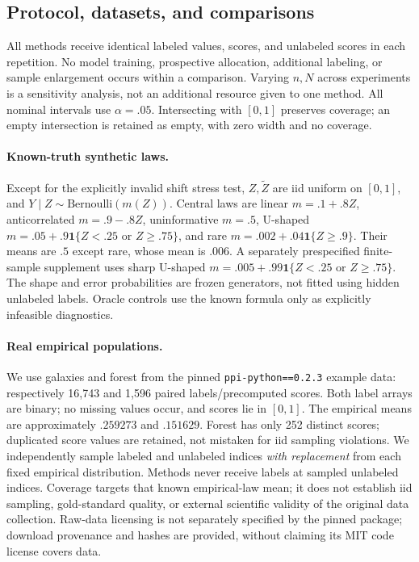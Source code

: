 \documentclass{article}
\newcommand{\ind}{\mathbf{1}}
\begin{document}
\subsection{Protocol, datasets, and comparisons}
All methods receive identical labeled values, scores, and unlabeled scores in each repetition. No model training, prospective allocation, additional labeling, or sample enlargement occurs within a comparison. Varying $n,N$ across experiments is a sensitivity analysis, not an additional resource given to one method. All nominal intervals use $\alpha=.05$. Intersecting with $[0,1]$ preserves coverage; an empty intersection is retained as empty, with zero width and no coverage.

\paragraph{Known-truth synthetic laws.}
Except for the explicitly invalid shift stress test, $Z,\widetilde Z$ are iid uniform on $[0,1]$, and $Y\mid Z\sim\mathrm{Bernoulli}(m(Z))$. Central laws are linear $m=.1+.8Z$, anticorrelated $m=.9-.8Z$, uninformative $m=.5$, U-shaped $m=.05+.9\ind\{Z<.25\text{ or }Z\ge.75\}$, and rare $m=.002+.04\ind\{Z\ge.9\}$. Their means are $.5$ except rare, whose mean is $.006$. A separately prespecified finite-sample supplement uses sharp U-shaped $m=.005+.99\ind\{Z<.25\text{ or }Z\ge.75\}$. The shape and error probabilities are frozen generators, not fitted using hidden unlabeled labels. Oracle controls use the known formula only as explicitly infeasible diagnostics.

\paragraph{Real empirical populations.}
We use galaxies and forest from the pinned \texttt{ppi-python==0.2.3} example data: respectively 16,743 and 1,596 paired labels/precomputed scores. Both label arrays are binary; no missing values occur, and scores lie in $[0,1]$. The empirical means are approximately $.259273$ and $.151629$. Forest has only 252 distinct scores; duplicated score values are retained, not mistaken for iid sampling violations. We independently sample labeled and unlabeled indices \emph{with replacement} from each fixed empirical distribution. Methods never receive labels at sampled unlabeled indices. Coverage targets that known empirical-law mean; it does not establish iid sampling, gold-standard quality, or external scientific validity of the original data collection. Raw-data licensing is not separately specified by the pinned package; download provenance and hashes are provided, without claiming its MIT code license covers data.
\end{document}

